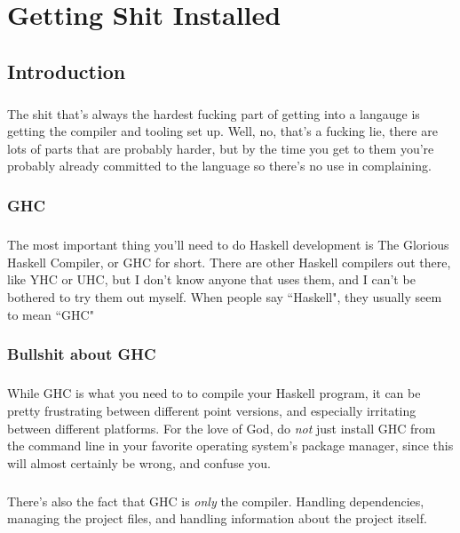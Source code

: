 \chapter{Getting Shit Installed}

\section{Introduction}
\paragraph{}
The shit that's always the hardest fucking part of getting into a langauge is getting the compiler and tooling set up.  Well, no, that's a fucking lie, there are lots of parts that are probably harder, but by the time you get to them you're probably already committed to the language so there's no use in complaining. 

\subsection{GHC}
\paragraph{}
The most important thing you'll need to do Haskell development is The Glorious Haskell Compiler, or GHC for short. There are other Haskell compilers out there, like YHC or UHC, but I don't know anyone that uses them, and I can't be bothered to try them out myself. When people say ``Haskell", they usually seem to mean ``GHC"

\subsection{Bullshit about GHC}
\paragraph{}
While GHC is what you need to to compile your Haskell program, it can be pretty frustrating between different point versions, and especially irritating between different platforms.  For the love of God, do \textit{not} just install GHC from the command line in your favorite operating system's package manager, since this will almost certainly be wrong, and confuse you.  

\paragraph{}
There's also the fact that GHC is \textit{only} the compiler.  Handling dependencies, managing the project files, and handling information about the project itself. 

